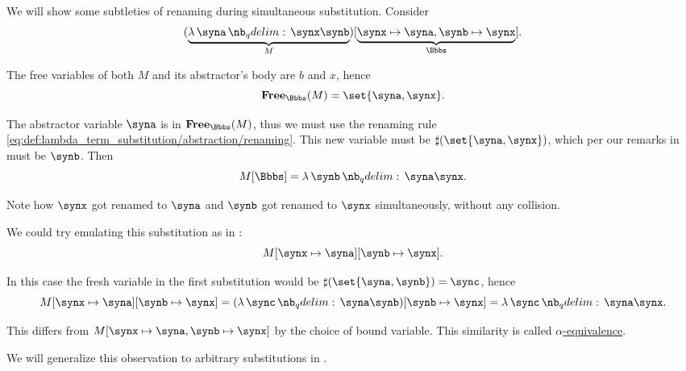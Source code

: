 \begin{example}
\begin{thmenum}
     We will show some subtleties of renaming during simultaneous substitution. Consider
    \begin{equation*}
      (\underbrace{\qabs \syna \synx \synb}_M)[\underbrace{\synx \mapsto \syna, \synb \mapsto \synx}_\Bbbs].
    \end{equation*}

    The free variables of both \( M \) and its abstractor's body are \( b \) and \( x \), hence
    \begin{equation*}
      \op*{Free}_\Bbbs(M) = \set{ \syna, \synx }.
    \end{equation*}

    The abstractor variable \( \syna \) is in \( \op*{Free}_\Bbbs(M) \), thus we must use the renaming rule \eqref{eq:def:lambda_term_substitution/abstraction/renaming}. This new variable must be \( \sharp(\set{ \syna, \synx }) \), which per our remarks in  must be \( \synb \). Then
    \begin{equation*}
      M[\Bbbs] = \qabs \synb \syna \synx.
    \end{equation*}

    Note how \( \synx \) got renamed to \( \syna \) and \( \synb \) got renamed to \( \synx \) simultaneously, without any collision.

    We could try emulating this substitution as in :
    \begin{equation*}
      M[\synx \mapsto \syna][\synb \mapsto \synx].
    \end{equation*}

    In this case the fresh variable in the first substitution would be \( \sharp(\set{ \syna, \synb }) = \sync \), hence
    \begin{equation*}
      M[\synx \mapsto \syna][\synb \mapsto \synx]
      =
      (\qabs \sync \syna \synb)[\synb \mapsto \synx]
      =
      \qabs \sync \syna \synx.
    \end{equation*}

    This differs from \( M[\synx \mapsto \syna, \synb \mapsto \synx] \) by the choice of bound variable. This similarity is called \hyperref[def:lambda_term_alpha_equivalence]{\( \alpha \)-equivalence}.

    We will generalize this observation to arbitrary substitutions in .
  \end{thmenum}
\end{example}

